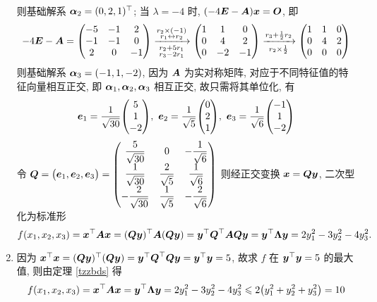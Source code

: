 \begin{solution}
\begin{enumerate}[label=(\arabic{*})]
              则基础解系 $\vb*{\alpha}_2=(0,2,1)^\top$; 当 $\lambda=-4$ 时, $(-4\vb*{E}-\vb*{A})\vb*{x}=\vb*{O}$, 即
              $$-4\vb*{E}-\vb*{A}=\mqty(-5&-1&2\\-1&-1&0\\2&0&-1)\xrightarrow[\substack{r_2+5r_1\\r_3-2r_1}]{\substack{r_2\times(-1)\\r_1\leftrightarrow r_2}}\mqty(1&1&0\\0&4&2\\0&-2&-1)\xrightarrow[r_2\times\frac{1}{2}]{r_3+\frac{1}{2}r_2}\mqty(1&1&0\\0&4&2\\0&0&0)$$
              则基础解系 $\vb*{\alpha}_3=(-1,1,-2)$, 因为 $\vb*{A}$ 为实对称矩阵, 对应于不同特征值的特征向量相互正交, 即 $\vb*{\alpha}_1,\vb*{\alpha}_2,\vb*{\alpha}_3$ 相互正交, 故只需将其单位化, 有
              $$\vb*{e}_1=\dfrac{1}{\sqrt{30}}\mqty(5\\1\\-2),~\vb*{e}_2=\dfrac{1}{\sqrt{5}}\mqty(0\\2\\1),~\vb*{e}_3=\dfrac{1}{\sqrt{6}}\mqty(-1\\1\\-2)$$
              令 $\vb*{Q}=\mqty(\vb*{e}_1,\vb*{e}_2,\vb*{e}_3)=\mqty(\dfrac{5}{\sqrt{30}}&0&-\dfrac{1}{\sqrt{6}}\\[6pt]
                  \dfrac{1}{\sqrt{30}}&\dfrac{2}{\sqrt{5}}&\dfrac{1}{\sqrt{6}}\\[6pt]
                  -\dfrac{2}{\sqrt{30}} & \dfrac{1}{\sqrt{5}} & -\dfrac{2}{\sqrt{6}}
                  )$ 则经正交变换 $\vb*{x}=\vb*{Qy}$, 二次型化为标准形 $$f(x_1,x_2,x_3)=\vb*{x}^\top\vb*{Ax}=(\vb*{Qy})^\top\vb*{A}(\vb*{Qy})=\vb*{y}^\top\vb*{Q}^\top\vb*{AQy}=\vb*{y}^\top\vb*{\Lambda y}=2y_1^2-3y_2^2-4y_3^2.$$
        \item 因为 $\vb*{x}^\top\vb*{x}=(\vb*{Qy})^\top(\vb*{Qy})=\vb*{y}^\top\vb*{Q}^\top\vb*{Qy}=\vb*{y}^\top\vb*{y}=5$, 故求 $f$ 在 $\vb*{y}^\top\vb*{y}=5$ 的最大值, 则由定理 \ref{tzzbds} 得
              $$f(x_1,x_2,x_3)=\vb*{x}^\top\vb*{Ax}=\vb*{y}^\top\vb*{\Lambda y}=2y_1^2-3y_2^2-4y_3^2\leqslant 2\qty(y_1^2+y_2^2+y_3^2)=10$$
    \end{enumerate}
\end{solution}

